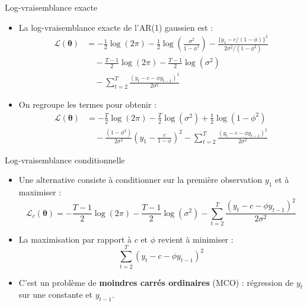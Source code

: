 \documentclass[11pt,aspectratio=169]{beamer}
\begin{document}
\begin{frame}{Log-vraisemblance exacte}

\begin{itemize}

\item La log-vraisemblance exacte de l'AR(1) gaussien est :
  \begin{align*}
  \mathcal{L}(\bm{\theta}) &= -\frac{1}{2}\log(2\pi) - \frac{1}{2}\log\!\left(\frac{\sigma^2}{1 - \phi^2}\right) - \frac{\{y_1 - c/(1 - \phi)\}^2}{2\sigma^2/(1 - \phi^2)} \\
  &\quad - \frac{T-1}{2}\log(2\pi) - \frac{T-1}{2}\log(\sigma^2) \\
  &\quad - \sum_{t=2}^{T} \frac{(y_t - c - \phi y_{t-1})^2}{2\sigma^2}
  \end{align*}

\item On regroupe les termes pour obtenir :
  \begin{align*}
  \mathcal{L}(\bm{\theta}) &= -\frac{T}{2}\log(2\pi) - \frac{T}{2}\log(\sigma^2) + \frac{1}{2}\log(1 - \phi^2) \\
  &\quad - \frac{(1 - \phi^2)}{2\sigma^2}\left(y_1 - \frac{c}{1 - \phi}\right)^2 - \sum_{t=2}^{T} \frac{(y_t - c - \phi y_{t-1})^2}{2\sigma^2}
  \end{align*}

\end{itemize}

\end{frame}

\begin{frame}{Log-vraisemblance conditionnelle}

\begin{itemize}

\item Une alternative consiste à conditionner sur la première observation $y_1$ et à maximiser :
  \[
  \mathcal{L}_c(\bm{\theta}) = -\frac{T-1}{2}\log(2\pi) - \frac{T-1}{2}\log(\sigma^2) - \sum_{t=2}^{T} \frac{(y_t - c - \phi y_{t-1})^2}{2\sigma^2}
  \]\newline

\item La maximisation par rapport à $c$ et $\phi$ revient à minimiser :
  \[
  \sum_{t=2}^{T} (y_t - c - \phi y_{t-1})^2
  \]\newline

\item C'est un problème de \textbf{moindres carrés ordinaires} (MCO) : régression de $y_t$ sur une constante et $y_{t-1}$.

\end{itemize}

\end{frame}
\end{document}
